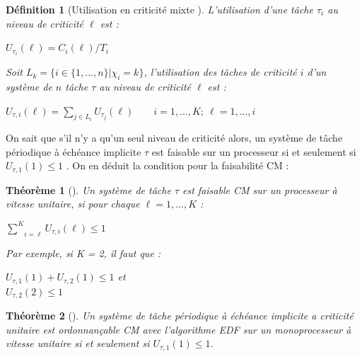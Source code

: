 \documentclass[a4paper]{report}
\theoremstyle{break}
\newtheorem{defin}{Définition}
\theoremstyle{breakplain}
\newtheorem{theo}{Théorème}
\begin{document}
\begin{defin}[Utilisation en criticité mixte \cite{BaruahBDMSS11}]
L'utilisation d'une tâche $\tau_i$ au niveau de criticité $\ell$ est :
\begin{center}
$U_{\tau_i}(\ell) = C_i(\ell)/T_i$
\end{center}
Soit $L_k = \{i \in \{1, ..., n\} | \chi_i = k\}$, l'utilisation des tâches de criticité $i$ d'un système de $n$ tâche $\tau$ au niveau de criticité $\ell$ est :
\begin{center}
$U_{\tau, i}(\ell) = \underset{j \in L_i}{\sum} U_{\tau_j}(\ell) \qquad i = 1,...,K;\ \ell = 1,...,i$
\end{center}
\end{defin}

On sait que s'il n'y a qu'un seul niveau de criticité alors, un système de tâche périodique à échéance implicite $\tau$ est faisable sur un processeur si et seulement si $U_{\tau, 1}(1) \leq 1$ \cite{liu1973scheduling}. On en déduit la condition pour la faisabilité CM :
\begin{theo}[\cite{BaruahBDMSS11}]
Un système de tâche $\tau$ est faisable CM sur un processeur à vitesse unitaire, si pour chaque $\ell = 1, ..., K$ :
\begin{center}
$\underset{i = \ell}{\overset{K}{\sum}} U_{\tau,i}(\ell) \leq 1$
\end{center}
 
 Par exemple, si K = 2, il faut que :
 
\begin{center}
$U_{\tau, 1}(1) + U_{\tau, 2}(1) \leq 1$ et\\
$U_{\tau, 2}(2) \leq 1$
\end{center}
\end{theo}

\begin{theo}[\cite{BaruahBDMSS11}]
Un système de tâche périodique à échéance implicite a criticité unitaire est ordonnançable CM avec l'algorithme EDF sur un monoprocesseur à vitesse unitaire si et seulement si $U_{\tau, 1}(1) \leq 1$.
\end{theo}
\end{document}

